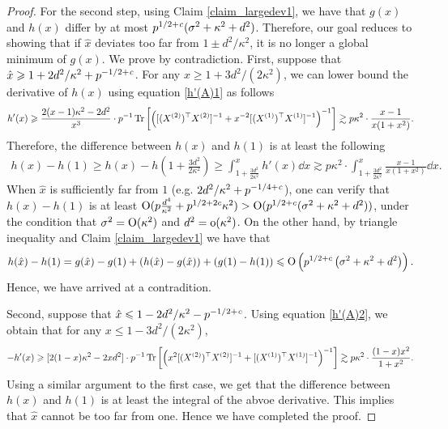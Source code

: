 \begin{proof}
For the second step, using Claim \ref{claim_largedev1}, we have that $g(x)$ and $h(x)$ differ by at most $p^{1/2 + {\mathit{c}}}(\sigma^2 + \kappa^2 + d^2)$.
Therefore, our goal reduces to showing that if $\hat{x}$ deviates too far from $1 \pm d^2 / \kappa^2$, it is no longer a global minimum of $g(x)$.
We prove by contradiction.
First, suppose that $\hat{x} \geqslant 1 + 2d^2 /\kappa^2 + p^{-1/2 + {\mathit{c}}}$.
For any $x \ge 1+3d^2/(2\kappa^2)$, we can lower bound the derivative of $h(x)$ using equation \eqref{h'(A)1} as follows
	\[ h'(x) \geqslant \frac{2(x-1)\kappa^2 - 2d^2}{x^3} \cdot p^{-1} \operatorname{Tr}\left[\left([(X^{(2)})^\top X^{(2)}]^{-1} + x^{-2} [(X^{(1)})^\top X^{(1)}]^{-1}\right)^{-1}\right]
	\gtrsim p\kappa^2\cdot \frac{x-1}{x (1 + x^2)}. \]
Therefore, the difference between $h(x)$ and $h(1)$ is at least the following
\begin{align*}
		h(x)-h(1) \ge h(x) - h\left(1+\frac{3d^2}{2\kappa^2}\right)
	\ge \int_{1+\frac{3d^2}{2\kappa^2}}^x h'(x)\dd x \gtrsim p\kappa^2 \cdot \int_{1 + \frac{3d^2}{2\kappa^2}}^x \frac{x-1}{x(1 + x^2)} \dd x.
\end{align*}
When $\hat{x}$ is sufficiently far from $1$ (e.g. $2d^2 / \kappa^2 + p^{-1/4+{\mathit{c}}}$), one can verify that $h(x) - h(1)$ is at least $\operatorname{O}(p\frac{d^4}{\kappa^2} + p^{1/2+2c} \kappa^2) > \operatorname{O}(p^{1/2 + c} (\sigma^2 + \kappa^2 + d^2))$, under the condition that $\sigma^2 =\operatorname{O}( \kappa^2)$ and $d^2 =\operatorname{o}({\kappa^2})$.
On the other hand, by triangle inequality and Claim \ref{claim_largedev1} we have that
\begin{align*}
	h(\hat{x}) - h(1) = g(\hat{x}) - g(1) + (h(\hat{x}) - g(\hat{x})) + (g(1) - h(1))
	\leqslant \operatorname{O}\left(p^{1/2+c}\left(\sigma^2 +\kappa^2+d^2 \right)\right).
\end{align*}
Hence, we have arrived at a contradition.


Second, suppose that $\hat{x} \leqslant 1 - 2d^2/ \kappa^2 - p^{-1/2 + {\mathit{c}}}$.
Using equation \eqref{h'(A)2}, we obtain that for any $x \le 1 - 3d^2/(2\kappa^2)$,
	\[ -h'(x)\geqslant  [2(1-x)\kappa^2 - 2xd^2] \cdot p^{-1} \operatorname{Tr}\left[\left(x^2[(X^{(2)})^\top X^{(2)}]^{-1} + [(X^{(1)})^\top X^{(1)}]^{-1}\right)^{-1}\right]  \gtrsim p\kappa^2 \cdot \frac{(1 - x)x^2}{1 + x^2}. \]
Using a similar argument to the first case, we get that the difference between $h(x)$ and $h(1)$ is at least the integral of the abvoe derivative.
This implies that $\hat{x}$ cannot be too far from one.
Hence we have completed the proof.
\end{proof}

